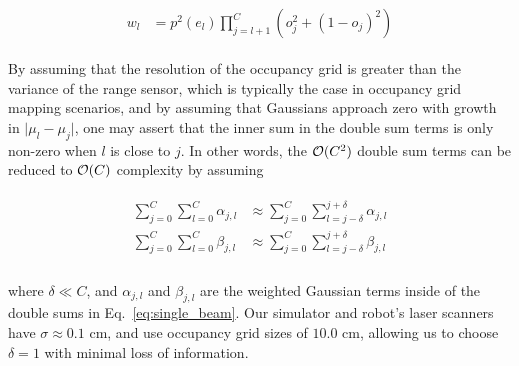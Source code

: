 \begin{align}
  \begin{split}
    w_{l} &=
    p^{2}(e_{l})
    \prod_{j=l+1}^{C}
    (o_{j}^{2} + (1 - o_{j})^{2})
  \end{split}
\end{align}

By assuming that the resolution of the occupancy grid is greater than the
variance of the range sensor, which is typically the case in occupancy grid
mapping scenarios, and by assuming that Gaussians approach zero with growth in $\vert \mu_{l} -
\mu_{j} \vert$, one may assert that the inner sum in the double sum terms is
only non-zero when $l$ is close to $j$. In other words, the $\mathcal{O}(C^2)$ double
sum terms can be reduced to $\mathcal{O}(C)$ complexity by assuming

\begin{align}
  \begin{split}
    \sum_{j=0}^{C}
    \sum_{l=0}^{C}
    \alpha_{j, l}
    &\approx
    \sum_{j=0}^{C}
    \sum_{l=j-\delta}^{j+\delta}
    \alpha_{j, l} \\
    \sum_{j=0}^{C}
    \sum_{l=0}^{C}
    \beta_{j, l}
    &\approx
    \sum_{j=0}^{C}
    \sum_{l=j-\delta}^{j+\delta}
    \beta_{j, l}\\
  \end{split}
\end{align}

where $\delta \ll C$, and $\alpha_{j,l}$ and $\beta_{j, l}$ are the weighted Gaussian terms inside
of the double sums in Eq.~\eqref{eq:single_beam}. Our simulator and robot's
laser scanners have $\sigma \approx 0.1$ cm, and use occupancy grid sizes of
$10.0$ cm, allowing us to choose $\delta = 1$ with minimal loss of information.

